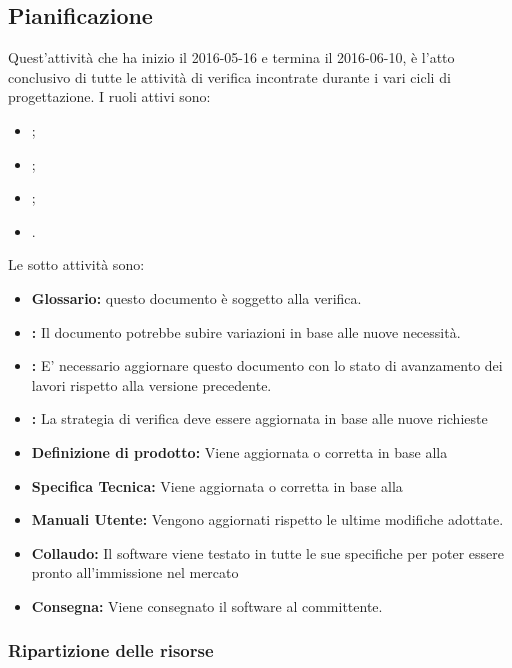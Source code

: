 \documentclass[12pt,a4paper]{article}
\begin{document}
\subsection{Pianificazione}
Quest'attività che ha inizio il 2016-05-16 e termina il 2016-06-10, è l'atto conclusivo di tutte le attività di verifica incontrate durante i vari cicli di progettazione. I ruoli attivi sono:
\begin{itemize}
	\item \PM;
	\item \AM;
	\item \PG;
	\item \VR.
\end{itemize}
Le sotto attività sono:
\begin{itemize}
	\item \textbf{Glossario:} 
	questo documento è soggetto alla verifica.
	\item \textbf{\NdP:}
	Il documento potrebbe subire variazioni in base
	alle nuove necessità.
	\item \textbf{\PdP:}
	E' necessario aggiornare questo documento con lo stato di avanzamento
	dei lavori rispetto alla versione precedente.
	\item \textbf{\PdQ:}
	La strategia di verifica deve essere aggiornata in base 
	alle nuove richieste
	\item \textbf{Definizione di prodotto:}
	Viene aggiornata o corretta in base alla \RQ
	\item \textbf{Specifica Tecnica:}
	Viene aggiornata o corretta in base alla \RQ
	\item \textbf{Manuali Utente:}
	Vengono aggiornati rispetto le ultime modifiche adottate.
	\item \textbf{Collaudo:}
	Il software viene testato in tutte le sue specifiche per poter essere pronto all'immissione nel mercato
	\item \textbf{Consegna:}
	Viene consegnato il software al committente.
\end{itemize}

\newpage

\subsubsection{Ripartizione delle risorse}
\end{document}
